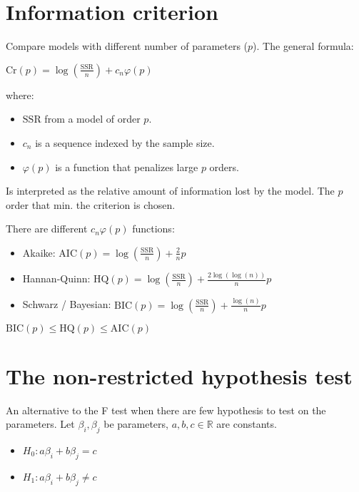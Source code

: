 \documentclass[10pt, a4paper, landscape]{article}
\newcommand{\SSR}{\mathrm{SSR}}
\begin{document}
\begin{multicols}{3}
		\columnbreak
		
		\section*{Information criterion}
		
		Compare models with different number of parameters ($p$). The general formula:
		
		\begin{center}
			$\mathrm{Cr}(p) = \log(\frac{\SSR}{n}) + c_{n} \varphi (p)$
		\end{center}
		
		where:
		
		\begin{itemize}[leftmargin=*]
			\item $\SSR$ from a model of order $p$.
			\item $c_{n}$ is a sequence indexed by the sample size.
			\item $\varphi(p)$ is a function that penalizes large $p$ orders.
		\end{itemize}
		
		Is interpreted as the relative amount of information lost by the model. The $p$ order that min. the criterion is chosen.
		
		There are different $c_{n} \varphi(p)$ functions:
		
		\begin{itemize}[leftmargin=*]
			\item Akaike: $\mathrm{AIC}(p) = \log(\frac{\SSR}{n}) + \frac{2}{n}p$
			\item Hannan-Quinn: $\mathrm{HQ}(p) = \log(\frac{\SSR}{n}) + \frac{2 \log(\log(n))}{n}p$
			\item Schwarz / Bayesian: $\mathrm{BIC}(p) = \log(\frac{\SSR}{n}) + \frac{\log(n)}{n}p$
		\end{itemize}
		
		$\mathrm{BIC}(p) \leq \mathrm{HQ}(p) \leq \mathrm{AIC}(p)$
		
		\section*{The non-restricted hypothesis test}
		
		An alternative to the F test when there are few hypothesis to test on the parameters. Let $\beta_{i}, \beta_{j}$ be parameters, $a, b, c \in \mathbb{R}$ are constants.
		
		\begin{itemize}[leftmargin=*]
			\item $H_{0}: a \beta_{i} + b \beta_{j} = c$
			\item $H_{1}: a \beta_{i} + b \beta_{j} \neq c$
		\end{itemize}
		

\end{multicols}
\end{document}
